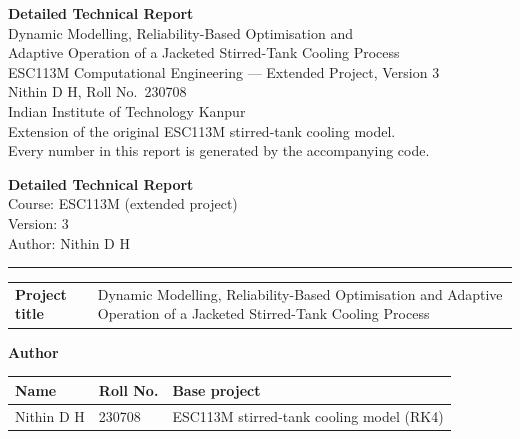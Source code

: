 \documentclass[11pt,letterpaper]{article}
\begin{document}
\begin{titlepage}
\vspace*{\fill}
\begin{center}
{\LARGE\bfseries Detailed Technical Report}\\[14pt]
Dynamic Modelling, Reliability-Based Optimisation and\\
Adaptive Operation of a Jacketed Stirred-Tank Cooling Process\\[10pt]
ESC113M Computational Engineering --- Extended Project, Version 3\\[6pt]
Nithin D H, Roll No.\ 230708\\[6pt]
Indian Institute of Technology Kanpur\\[22pt]
Extension of the original ESC113M stirred-tank cooling model.\\
Every number in this report is generated by the accompanying code.
\end{center}
\vspace*{\fill}
\end{titlepage}

\setcounter{page}{1}
\begin{center}
{\LARGE\bfseries Detailed Technical Report}\\[8pt]
Course: ESC113M (extended project)\\[3pt]
Version: 3\\[3pt]
Author: Nithin D H
\end{center}
\vspace{4pt}
\noindent\rule{\textwidth}{0.4pt}
\vspace{2pt}

\noindent\begin{tabular}{@{}p{2.8cm}p{13.4cm}@{}}
\textbf{Project title} & Dynamic Modelling, Reliability-Based Optimisation and Adaptive Operation of a Jacketed Stirred-Tank Cooling Process\\
\end{tabular}

\vspace{6pt}
\noindent\textbf{Author}\\[2pt]
\begin{tabular*}{\textwidth}{@{\extracolsep{\fill}}lll@{}}
\toprule
Name & Roll No. & Base project\\
\midrule
Nithin D H & 230708 & ESC113M stirred-tank cooling model (RK4)\\
\bottomrule
\end{tabular*}
\end{document}
